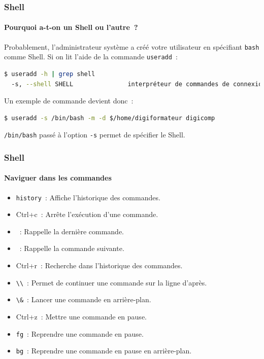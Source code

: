 \documentclass{beamer}
\begin{document}
    \begin{frame}[fragile]
        \transdissolve
        \frametitle{Shell}
        \framesubtitle{Pourquoi a-t-on un Shell ou l'autre~?}
        Probablement, l'administrateur système a créé votre utilisateur en spécifiant \lstinline{bash} comme Shell.
        \bigbreak
        Si on lit l'aide de la commande \lstinline{useradd}~:
        \begin{lstlisting}[language=bash]
$ useradd -h | grep shell
  -s, --shell SHELL               interpréteur de commandes de connexion du nouveau compte
        \end{lstlisting}
        \bigbreak
        Un exemple de commande devient donc~:
        \begin{lstlisting}[language=bash]
$ useradd -s /bin/bash -m -d $/home/digiformateur digicomp
        \end{lstlisting}
        \bigbreak
        \lstinline{/bin/bash} passé à l'option \lstinline{-s} permet de spécifier le Shell.
    \end{frame}

    \begin{frame}
        \transdissolve
        \frametitle{Shell}
        \framesubtitle{Naviguer dans les commandes}
        \begin{itemize}
            \item \lstinline{history}~: Affiche l'historique des commandes.
            \item Ctrl+c~: Arrête l'exécution d'une commande.
            \item {}~: Rappelle la dernière commande.
            \item {}~: Rappelle la commande suivante.
            \item Ctrl+r~: Recherche dans l'historique des commandes.
            \item \lstinline{\\}~: Permet de continuer une commande sur la ligne d'après.
            \item \lstinline{\&}~: Lancer une commande en arrière-plan.
            \item Ctrl+z~: Mettre une commande en pause.
            \item \lstinline{fg}~: Reprendre une commande en pause.
            \item \lstinline{bg}~: Reprendre une commande en pause en arrière-plan.
        \end{itemize}
    \end{frame}
\end{document}
